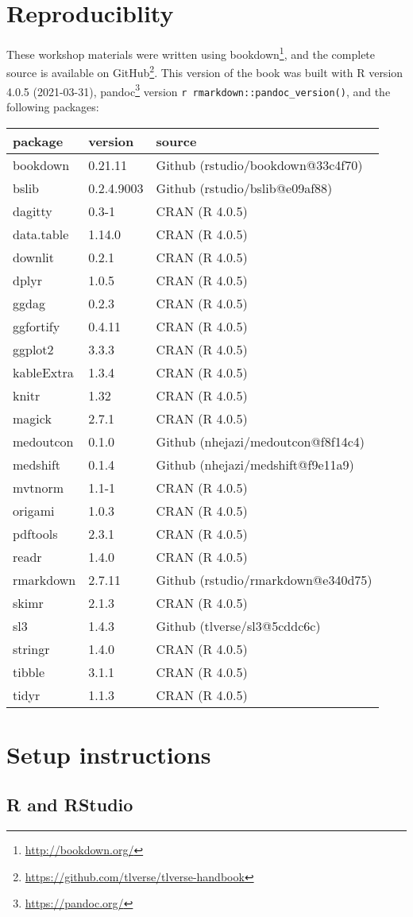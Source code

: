 \documentclass[
  12pt, krantz2,
]{book}
\renewcommand{\href}[2]{#2\footnote{\url{#1}}}
\theoremstyle{definition}
\theoremstyle{definition}
\theoremstyle{definition}
\newcommand{\1}{\mathbbm{1}}
\begin{document}
\hypertarget{repro}{%
\section{Reproduciblity}\label{repro}}

These workshop materials were written using \href{http://bookdown.org/}{bookdown},
and the complete source is available on
\href{https://github.com/tlverse/tlverse-handbook}{GitHub}. This version of the book
was built with R version 4.0.5 (2021-03-31), \href{https://pandoc.org/}{pandoc} version \texttt{r\ rmarkdown::pandoc\_version()}, and the following packages:

\begin{longtable}[]{@{}lll@{}}
\toprule
package & version & source\tabularnewline
\midrule
\endhead
bookdown & 0.21.11 & Github (rstudio/bookdown@33c4f70)\tabularnewline
bslib & 0.2.4.9003 & Github (rstudio/bslib@e09af88)\tabularnewline
dagitty & 0.3-1 & CRAN (R 4.0.5)\tabularnewline
data.table & 1.14.0 & CRAN (R 4.0.5)\tabularnewline
downlit & 0.2.1 & CRAN (R 4.0.5)\tabularnewline
dplyr & 1.0.5 & CRAN (R 4.0.5)\tabularnewline
ggdag & 0.2.3 & CRAN (R 4.0.5)\tabularnewline
ggfortify & 0.4.11 & CRAN (R 4.0.5)\tabularnewline
ggplot2 & 3.3.3 & CRAN (R 4.0.5)\tabularnewline
kableExtra & 1.3.4 & CRAN (R 4.0.5)\tabularnewline
knitr & 1.32 & CRAN (R 4.0.5)\tabularnewline
magick & 2.7.1 & CRAN (R 4.0.5)\tabularnewline
medoutcon & 0.1.0 & Github (nhejazi/medoutcon@f8f14c4)\tabularnewline
medshift & 0.1.4 & Github (nhejazi/medshift@f9e11a9)\tabularnewline
mvtnorm & 1.1-1 & CRAN (R 4.0.5)\tabularnewline
origami & 1.0.3 & CRAN (R 4.0.5)\tabularnewline
pdftools & 2.3.1 & CRAN (R 4.0.5)\tabularnewline
readr & 1.4.0 & CRAN (R 4.0.5)\tabularnewline
rmarkdown & 2.7.11 & Github (rstudio/rmarkdown@e340d75)\tabularnewline
skimr & 2.1.3 & CRAN (R 4.0.5)\tabularnewline
sl3 & 1.4.3 & Github (tlverse/sl3@5cddc6c)\tabularnewline
stringr & 1.4.0 & CRAN (R 4.0.5)\tabularnewline
tibble & 3.1.1 & CRAN (R 4.0.5)\tabularnewline
tidyr & 1.1.3 & CRAN (R 4.0.5)\tabularnewline
\bottomrule
\end{longtable}

\hypertarget{setup}{%
\section{Setup instructions}\label{setup}}

\hypertarget{r-and-rstudio}{%
\subsection{R and RStudio}\label{r-and-rstudio}}
\end{document}
